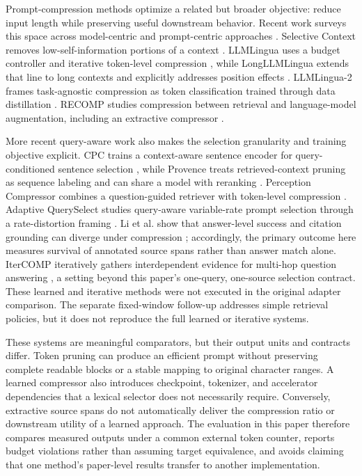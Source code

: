 \documentclass[
]{article}
\begin{document}
Prompt-compression methods optimize a related but broader objective:
reduce input length while preserving useful downstream behavior.
Recent work surveys this space across model-centric and prompt-centric
approaches \citep{li-etal-2025-prompt-compression-survey}.
Selective Context removes low-self-information portions of a context
\citep{li-etal-2023-selective-context}. LLMLingua uses a budget
controller and iterative token-level compression
\citep{jiang-etal-2023-llmlingua}, while LongLLMLingua extends that line
to long contexts and explicitly addresses position effects
\citep{jiang-etal-2024-longllmlingua}. LLMLingua-2 frames task-agnostic
compression as token classification trained through data distillation
\citep{pan-etal-2024-llmlingua-2}. RECOMP studies compression between
retrieval and language-model augmentation, including an extractive
compressor \citep{xu-etal-2024-recomp}.

More recent query-aware work also makes the selection granularity and
training objective explicit. CPC trains a context-aware sentence encoder
for query-conditioned sentence selection \citep{liskavets-etal-2025-cpc},
while Provence treats retrieved-context pruning as sequence labeling and
can share a model with reranking \citep{chirkova-etal-2025-provence}.
Perception Compressor combines a question-guided retriever with
token-level compression \citep{tang-etal-2025-perception-compressor}.
Adaptive QuerySelect studies query-aware variable-rate prompt selection
through a rate-distortion framing \citep{nagle-etal-2024-fundamental-limits}.
Li et al. show that answer-level success and citation grounding can diverge
under compression \citep{li-etal-2026-efficiency}; accordingly, the primary
outcome here measures survival of annotated source spans rather than answer
match alone. IterCOMP iteratively gathers interdependent evidence for multi-hop
question answering \citep{yun-kim-2026-itercomp}, a setting beyond this
paper's one-query, one-source selection contract. These learned and iterative
methods were not executed in the original adapter comparison. The separate
fixed-window follow-up addresses simple retrieval policies, but it does not
reproduce the full learned or iterative systems.

These systems are meaningful comparators, but their output units and
contracts differ. Token pruning can produce an efficient prompt without
preserving complete readable blocks or a stable mapping to original
character ranges. A learned compressor also introduces checkpoint,
tokenizer, and accelerator dependencies that a lexical selector does not
necessarily require. Conversely, extractive source spans do not
automatically deliver the compression ratio or downstream utility of a
learned approach. The evaluation in this paper therefore compares
measured outputs under a common external token counter, reports budget
violations rather than assuming target equivalence, and avoids claiming
that one method's paper-level results transfer to another
implementation.
\end{document}
